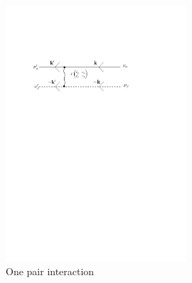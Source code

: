 \documentclass[11pt]{article} %
\begin{document}
\begin{figure}[htbp]
\begin{center}
\includegraphics[width=0.6\textwidth]{VPair}
\caption{One pair interaction\label{fig:VPair}} 

\end{center}
\end{figure}
\end{document}
